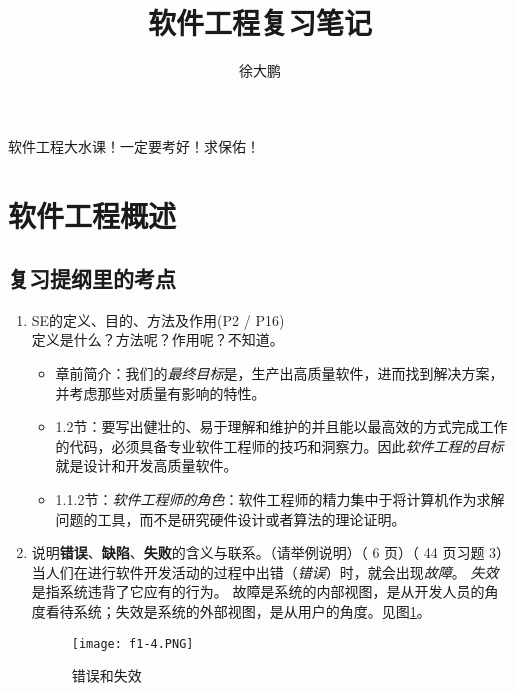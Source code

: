 \documentclass[14pt, letterpaper, UTF8, fontset=windowsnew, heading=true]{article}
\title{软件工程复习笔记}
\author{徐大鹏}
\begin{document}
\maketitle

软件工程大水课！一定要考好！求保佑！

\section{软件工程概述}

\subsection{复习提纲里的考点}

\begin{enumerate}
	\item SE的定义、目的、方法及作用(P2 / P16) \\
	定义是什么？方法呢？作用呢？不知道。
	\begin{itemize}
		\item 章前简介：我们的\emph{最终目标}是，生产出高质量软件，进而找到解决方案，并考虑那些对质量有影响的特性。
		\item 1.2节：要写出健壮的、易于理解和维护的并且能以最高效的方式完成工作的代码，必须具备专业软件工程师的技巧和洞察力。因此\emph{软件工程的目标}就是设计和开发高质量软件。
		\item 1.1.2节：\emph{软件工程师的角色}：软件工程师的精力集中于将计算机作为求解问题的工具，而不是研究硬件设计或者算法的理论证明。
	\end{itemize}
	
	
	\item
	说明\textbf{错误}、\textbf{缺陷}、\textbf{失败}的含义与联系。（请举例说明）（ 6 页）（ 44 页习题 3） \\
	当人们在进行软件开发活动的过程中出错（\emph{错误}）时，就会出现\emph{故障}。
	\emph{失效}是指系统违背了它应有的行为。
	故障是系统的内部视图，是从开发人员的角度看待系统；失效是系统的外部视图，是从用户的角度。见图\ref{fig:errorfailure}。
	\begin{figure}[h]
		\centering
		\texttt{[image: f1-4.PNG]}
		\caption{错误和失效}
		\label{fig:errorfailure}
	\end{figure}
	

\end{enumerate}
\end{document}
